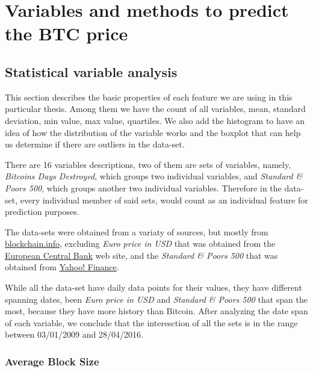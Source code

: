 
\chapter{Variables and methods to predict the BTC price} %

\label{ch:variables}


\section{Statistical variable analysis}
\label{sec:stat-var-analysis}

This section describes the basic properties of each feature we are
using in this particular thesis. Among them we have the count of all
variables, mean, standard deviation, min value, max value, quartiles.
We also add the histogram to have an idea of how the distribution of
the variable works and the boxplot that can help us determine if there
are outliers in the data-set.

There are 16 variables descriptions, two of them are sets of
variables, namely, \textit{Bitcoins Days Destroyed}, which groups two
individual variables, and \textit{Standard \& Poors 500}, which groups
another two individual variables. Therefore in the data-set, every
individual member of said sets, would count as an individual feature
for prediction purposes.

The data-sets were obtained from a variaty of sources, but mostly from
\href{https://blockchain.info/charts}{blockchain.info}, excluding
\textit{Euro price in USD} that was obtained from the
\href{https://www.ecb.europa.eu/stats/exchange/eurofxref/html/index.en.html}{European
  Central Bank} web site, and the \textit{Standard \& Poors 500} that
was obtained from
\href{https://finance.yahoo.com/q/hp?s=^GSPC\&a=00\&b=3\&c=1950\&d=05\&e=8\&f=2016\&g=d}{Yahoo!
  Finance}.

While all the data-set have daily data points for their values, they
have different spanning dates, been \textit{Euro price in USD} and
\textit{Standard \& Poors 500} that span the most, because they have
more history than Bitcoin. After analyzing the date span of each
variable, we conclude that the interesction of all the sets is in the
range between 03/01/2009 and 28/04/2016.

\subsection{Average Block Size}
\label{sec:avg-block-size}

